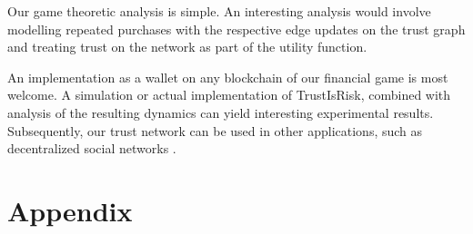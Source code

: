 \documentclass[11pt]{llncs}
\theoremstyle{definition}
\begin{document}
        Our game theoretic analysis is simple. An interesting analysis would involve modelling repeated purchases with the
        respective edge updates on the trust graph and treating trust on the network as part of the utility function.

        An implementation as a wallet on any blockchain of our financial game is most welcome. A simulation or actual
        implementation of TrustIsRisk, combined with analysis of the resulting dynamics can yield interesting experimental
        results. Subsequently, our trust network can be used in other applications, such as decentralized social networks
        \cite{synereo}.

  \section*{Appendix}
\end{document}
